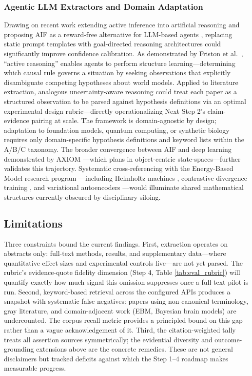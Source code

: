 \documentclass[
  english,
]{article}
\begin{document}
\subsubsection{Agentic LLM Extractors and Domain
Adaptation}\label{agentic-llm-extractors-and-domain-adaptation}

Drawing on recent work extending active inference into artificial
reasoning \citep{friston2025active} and proposing AIF as a reward-free
alternative for LLM-based agents \citep{wen2025missing}, replacing
static prompt templates with goal-directed reasoning architectures could
significantly improve confidence calibration. As demonstrated by Friston
et al.~\citep{friston2025active}, ``active reasoning'' enables agents to
perform structure learning---determining which causal rule governs a
situation by seeking observations that explicitly disambiguate competing
hypotheses about world models. Applied to literature extraction,
analogous uncertainty-aware reasoning could treat each paper as a
structured observation to be parsed against hypothesis definitions via
an optimal experimental design rubric---directly operationalizing Next
Step 2's claim-evidence pairing at scale. The framework is
domain-agnostic by design; adaptation to foundation models, quantum
computing, or synthetic biology requires only domain-specific hypothesis
definitions and keyword lists within the A/B/C taxonomy. The broader
convergence between AIF and deep learning demonstrated by AXIOM
\citep{heins2025axiom}---which plans in object-centric
state-spaces---further validates this trajectory. Systematic
cross-referencing with the Energy-Based Model research program
\citep{lecun2006tutorial}---including Helmholtz machines
\citep{dayan1995helmholtz}, contrastive divergence training
\citep{hinton2002training}, and variational autoencoders
\citep{kingma2014auto}---would illuminate shared mathematical structures
currently obscured by disciplinary siloing.

\subsection{Limitations}\label{limitations}

Three constraints bound the current findings. First, extraction operates
on abstracts only: full-text methods, results, and supplementary
data---where quantitative effect sizes and experimental controls
live---are not yet parsed. The rubric's evidence-quote fidelity
dimension (Step 4, Table \ref{tab:eval_rubric}) will quantify exactly
how much signal this omission suppresses once a full-text pilot is run.
Second, keyword-based retrieval across the configured APIs produces a
snapshot with systematic false negatives: papers using non-canonical
terminology, gray literature, and domain-adjacent work (EBM, Bayesian
brain models) are undercounted. The corpus recall metric provides a
principled bound on this gap rather than a vague acknowledgement of it.
Third, the citation-weighted tally treats all assertion sources
symmetrically; the evidential diversity and outcome-grounding extensions
above are the concrete remedies. These are not general disclaimers but
tracked deficits against which the Step 1--4 roadmap makes measurable
progress.
\end{document}
